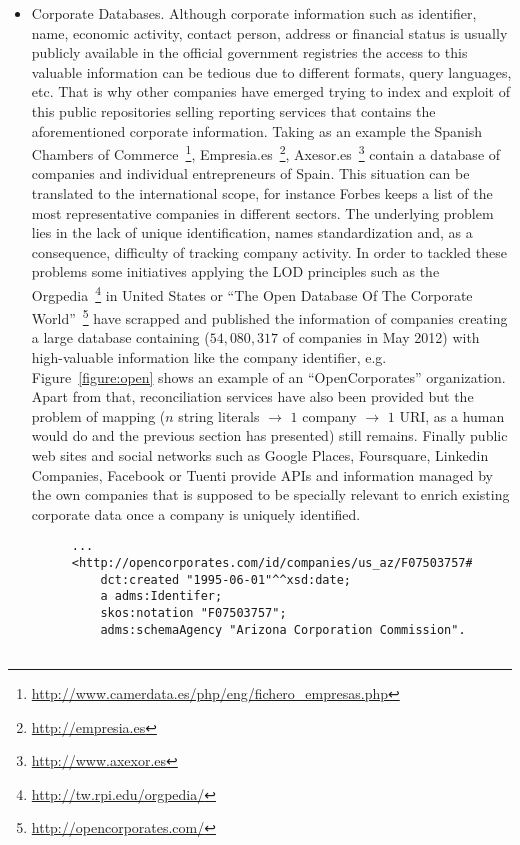 \documentclass{llncs}
\begin{document}
\begin{itemize}
 
 \item Corporate Databases. Although corporate information such as identifier, name, economic activity, contact person, address or 
 financial status is usually publicly available in the official government registries the access to this valuable information can be 
 tedious due to different formats, query languages, etc. That is why other companies have emerged trying to index and exploit of 
 this public repositories selling reporting services that contains the aforementioned corporate information. Taking as 
 an example the Spanish Chambers of Commerce~\footnote{\url{http://www.camerdata.es/php/eng/fichero\_empresas.php}},
 Empresia.es~\footnote{\url{http://empresia.es}}, Axesor.es~\footnote{\url{http://www.axexor.es}} contain a database of companies and individual 
 entrepreneurs of Spain. This situation can be translated to the international scope, for instance Forbes keeps a list of 
 the most representative companies in different sectors. The underlying problem lies in the lack of unique identification, 
 names standardization and, as a consequence, difficulty of tracking company activity. In order to tackled these problems some 
 initiatives applying the LOD principles such as the Orgpedia~\footnote{\url{http://tw.rpi.edu/orgpedia/}} in United States or 
 ``The Open Database Of The Corporate World''~\footnote{\url{http://opencorporates.com/}} have scrapped and published the information 
 of companies creating a large database containing ($54,080,317$ of companies in May 2012) with high-valuable information like the company 
 identifier, e.g. Figure~\ref{figure:open} shows an example of an ``OpenCorporates'' organization. 
 Apart from that, reconciliation services have also been provided but the problem of mapping ($n$ string literals $\to$ $1$ company $\to$ $1$ URI, 
 as a human would do and the previous section has presented) still remains. Finally public web sites and social networks such as Google 
 Places, Foursquare, Linkedin Companies, Facebook or Tuenti provide APIs and information managed by the own companies that is supposed 
 to be specially relevant to enrich existing corporate data once a company is uniquely identified.
 
  
 
\begin{figure}[!h]
\begin{center}
\begin{lstlisting}[language=SPARQL]
...
<http://opencorporates.com/id/companies/us_az/F07503757#id> 
	dct:created "1995-06-01"^^xsd:date;
	a adms:Identifer;
	skos:notation "F07503757";
	adms:schemaAgency "Arizona Corporation Commission".


\end{lstlisting}
\end{center}
\end{figure}
\end{itemize}
\end{document}
